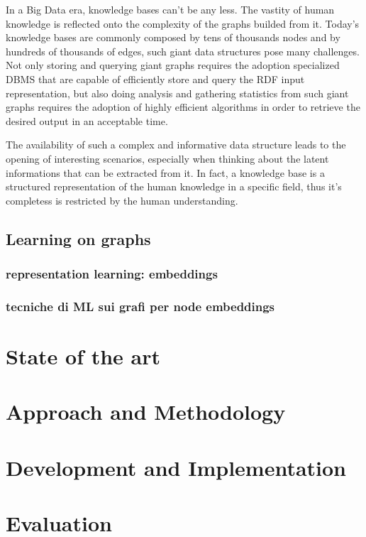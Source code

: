 \documentclass[%
    corpo=13.5pt,
    twoside,
    oldstyle,
    tipotesi=magistrale,
    greek,
    evenboxes
]{toptesi}
\begin{document}
In a Big Data era, knowledge bases can't be any less. The vastity of human
knowledge is reflected onto the complexity of the graphs
builded from it. Today's knowledge bases are commonly composed by tens of
thousands nodes and by hundreds of thousands of edges, such giant data
structures pose many challenges.
Not only storing and querying giant graphs requires the adoption
specialized DBMS that are capable of efficiently store and query the RDF
input representation, but also doing analysis and gathering statistics from
such giant graphs requires the adoption of highly efficient algorithms in
order to retrieve the desired output in an acceptable time.

The availability of such a complex and informative data structure leads
to the opening of interesting scenarios, especially when thinking about
the latent informations that can be extracted from it. In
fact, a knowledge base is a structured representation of the
human knowledge in a specific field, thus it's completess is restricted
by the human understanding.


\section{Learning on graphs}

\subsection{representation learning: embeddings}

\subsection{tecniche di ML sui grafi per node embeddings}


\chapter{State of the art}

\chapter{Approach and Methodology}

\chapter{Development and Implementation}

\chapter{Evaluation}
\end{document}
